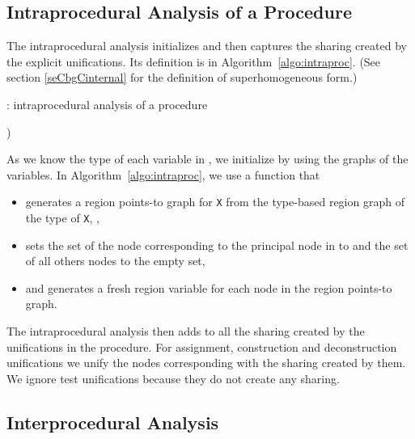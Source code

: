 \documentclass{tlp}
\newcommand{\code}[1]{{\tt#1}}
\begin{document}
\subsection{Intraprocedural Analysis of a Procedure}

The intraprocedural analysis initializes 
and then captures the sharing created by the explicit unifications.
Its definition is in Algorithm~\ref{algo:intraproc}.
(See section \ref{seCbgCinternal} for the definition of superhomogeneous form.)
\begin{algorithm}
    \small
    \caption{:
        intraprocedural analysis of a procedure }
    \label{algo:intraproc}
\begin{algorithmic}

    \STATE 
    \FORALL{}
        \STATE 
    \ENDFOR

    \FORALL{}
        \IF{}
            \STATE 
        \ELSIF{}
                \STATE )
            \ENDFOR
        \ENDIF
    \ENDFOR

\end{algorithmic}
\normalsize
\end{algorithm}

As we know the type of each variable in ,
we initialize  by using
the  graphs of the variables.
In Algorithm~\ref{algo:intraproc},
we use a function 
that
\begin{itemize}
\item
    generates a region points-to graph for \code{X}
    from the type-based region graph of the type of \code{X},
    ,
\item
    sets the  set of the node
    corresponding to the principal node in 
    to 
    and the  set of all others nodes to the empty set,
\item
    and generates a fresh region variable
    for each node in the region points-to graph.
\end{itemize}

The intraprocedural analysis then adds to 
all the sharing created by the unifications in the procedure.
For assignment, construction and deconstruction unifications
we unify the nodes corresponding with the sharing created by them.
We ignore test unifications because they do not create any sharing.

\subsection{Interprocedural Analysis}
\end{document}
